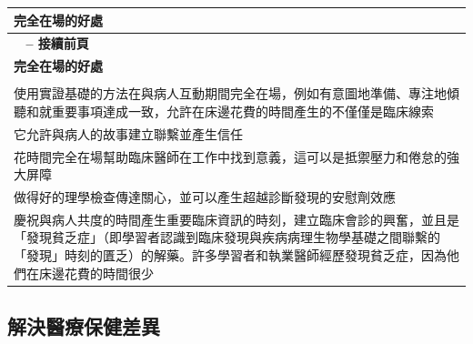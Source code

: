 \documentclass[12pt,a4paper]{article}
\begin{document}
\begin{longtable}{>{\raggedright\arraybackslash}p{15cm}}
\toprule
\textbf{\textcolor{emergency_red}{完全在場的好處}} \\
\midrule
\endfirsthead

\multicolumn{1}{c}%
{{\bfseries \tablename\ \thetable{} -- 接續前頁}} \\
\toprule
\textbf{\textcolor{emergency_red}{完全在場的好處}} \\
\midrule
\endhead

\midrule \multicolumn{1}{r}{{接續下頁}} \\ \midrule
\endfoot

\bottomrule
\endlastfoot

使用實證基礎的方法在與病人互動期間完全在場，例如有意圖地準備、專注地傾聽和就重要事項達成一致，允許在床邊花費的時間產生的不僅僅是臨床線索 \\

它允許與病人的故事建立聯繫並產生信任 \\

花時間完全在場幫助臨床醫師在工作中找到意義，這可以是抵禦壓力和倦怠的強大屏障 \\

做得好的理學檢查傳達關心，並可以產生超越診斷發現的安慰劑效應 \\

慶祝與病人共度的時間產生重要臨床資訊的時刻，建立臨床會診的興奮，並且是「發現貧乏症」（即學習者認識到臨床發現與疾病病理生物學基礎之間聯繫的「發現」時刻的匱乏）的解藥。許多學習者和執業醫師經歷發現貧乏症，因為他們在床邊花費的時間很少 \\
\end{longtable}

\subsection{解決醫療保健差異}
\end{document}
